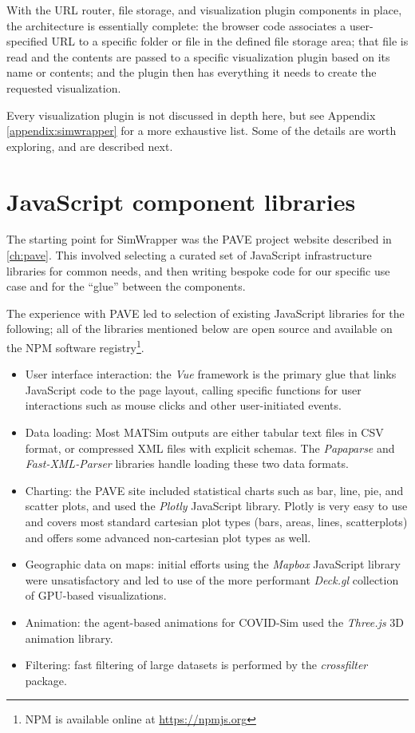 With the URL router, file storage, and visualization plugin components in place, the architecture is essentially complete: the browser code associates a user-specified URL to a specific folder or file in the defined file storage area; that file is read and the contents are passed to a specific visualization plugin based on its name or contents; and the plugin then has everything it needs to create the requested visualization.

Every visualization plugin is not discussed in depth here, but see Appendix \ref{appendix:simwrapper} for a more exhaustive list. Some of the details are worth exploring, and are described next.


\hypertarget{simwrapper-javascript-libraries}{%
\section{JavaScript component libraries}\label{simwrapper-javascript-libraries}}

The starting point for SimWrapper was the PAVE project website described in \ref{ch:pave}. This involved selecting a curated set of JavaScript infrastructure libraries for common needs, and then writing bespoke code for our specific use case and for the ``glue'' between the components.

The experience with PAVE led to selection of existing JavaScript libraries for the following; all of the libraries mentioned below are open source and available on the NPM software registry\footnote{NPM is available online at \url{https://npmjs.org}}.

\begin{itemize}
\item
  User interface interaction: the \emph{Vue} framework is the primary glue that
  links JavaScript code to the page layout, calling specific functions for user
  interactions such as mouse clicks and other user-initiated events.
\item
  Data loading: Most MATSim outputs are either tabular text files in CSV
  format, or compressed XML files with explicit schemas. The \emph{Papaparse}
  and \emph{Fast-XML-Parser} libraries handle loading these two data formats.
\item
  Charting: the PAVE site included statistical charts such as bar, line,
  pie, and scatter plots, and used the \emph{Plotly} JavaScript library. Plotly
  is very easy to use and covers most standard cartesian plot types (bars, areas, lines, scatterplots) and offers some advanced non-cartesian plot types as well.
\item
  Geographic data on maps: initial efforts using the \emph{Mapbox}
  JavaScript library were unsatisfactory and led to use of the more performant
  \emph{Deck.gl} collection of \gls{GPU}-based visualizations.
\item
  Animation: the agent-based animations for COVID-Sim used the \emph{Three.js}
  3D animation library.
  \item
  Filtering: fast filtering of large datasets is performed by the \emph{crossfilter} package.
\end{itemize}

